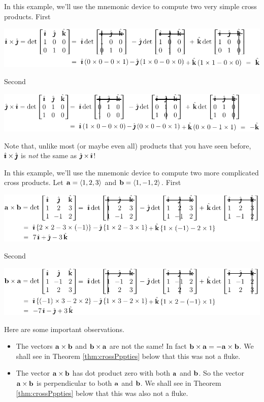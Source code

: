 \begin{eg}\label{eg:GEOcrossijji}
In this example, we'll use the mnemonic device to compute two very simple cross
products. First
      \begin{center}
      \includegraphics{detij.pdf}
      \end{center}
Second
      \begin{center}
      \includegraphics{detji.pdf}
      \end{center}
Note that, unlike most (or maybe even all) products that you have seen before, $\hat{\pmb{\imath}}\times\hat{\pmb{\jmath}}$ is \emph{not} the same as $\hat{\pmb{\jmath}}\times\hat{\pmb{\imath}}$!
\end{eg}

\begin{eg}\label{eg:GEOcrossEgA}
In this example, we'll use the mnemonic device to compute two more complicated cross products. Let $\mathbf{a}=\left< 1,2,3 \right>$ and $\mathbf{b}=\left< 1,-1,2 \right>$. First
      \begin{center}
      \includegraphics{detEgA1.pdf}
      \end{center}
Second
      \begin{center}
      \includegraphics{detEgA2.pdf}
      \end{center}
Here are some important observations.
\begin{itemize}
\item 
The vectors $\mathbf{a}\times\mathbf{b}$ and $\mathbf{b}\times\mathbf{a}$ are not the same! In fact
    $\mathbf{b}\times\mathbf{a}=-\mathbf{a}\times\mathbf{b}$. We shall see in Theorem \ref{thm:crossPppties}
    below that this was not a fluke.

\item
The vector $\mathbf{a}\times\mathbf{b}$ has dot product zero with both $\mathbf{a}$ and $\mathbf{b}$.
So the vector  $\mathbf{a}\times\mathbf{b}$ is perpendicular to both $\mathbf{a}$ and $\mathbf{b}$. 
We shall see in Theorem \ref{thm:crossPppties} below that this was also not a fluke.
\end{itemize}
\end{eg}

